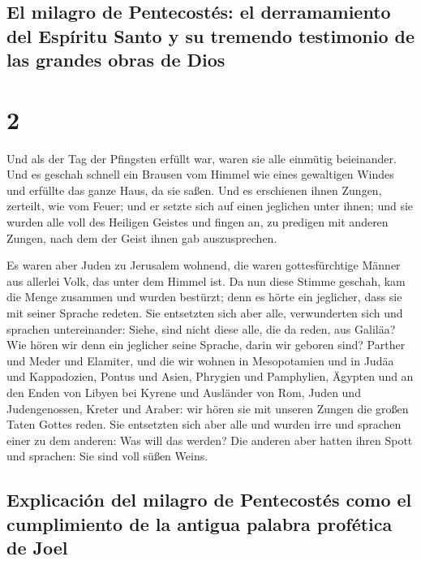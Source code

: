 \hypertarget{el-milagro-de-pentecostuxe9s-el-derramamiento-del-espuxedritu-santo-y-su-tremendo-testimonio-de-las-grandes-obras-de-dios}{%
\subsection{El milagro de Pentecostés: el derramamiento del Espíritu
Santo y su tremendo testimonio de las grandes obras de
Dios}\label{el-milagro-de-pentecostuxe9s-el-derramamiento-del-espuxedritu-santo-y-su-tremendo-testimonio-de-las-grandes-obras-de-dios}}

\hypertarget{section-1}{%
\section{2}\label{section-1}}

 Und als der Tag der Pfingsten erfüllt war, waren sie alle
einmütig beieinander.  Und es geschah schnell ein Brausen
vom Himmel wie eines gewaltigen Windes und erfüllte das ganze Haus, da
sie saßen.  Und es erschienen ihnen Zungen, zerteilt, wie
vom Feuer; und er setzte sich auf einen jeglichen unter ihnen;
 und sie wurden alle voll des Heiligen Geistes und fingen
an, zu predigen mit anderen Zungen, nach dem der Geist ihnen gab
auszusprechen.

 Es waren aber Juden zu Jerusalem wohnend, die waren
gottesfürchtige Männer aus allerlei Volk, das unter dem Himmel ist.
 Da nun diese Stimme geschah, kam die Menge zusammen und
wurden bestürzt; denn es hörte ein jeglicher, dass sie mit seiner
Sprache redeten.  Sie entsetzten sich aber alle,
verwunderten sich und sprachen untereinander: Siehe, sind nicht diese
alle, die da reden, aus Galiläa?  Wie hören wir denn ein
jeglicher seine Sprache, darin wir geboren sind?  Parther
und Meder und Elamiter, und die wir wohnen in Mesopotamien und in Judäa
und Kappadozien, Pontus und Asien,  Phrygien und
Pamphylien, Ägypten und an den Enden von Libyen bei Kyrene und Ausländer
von Rom,  Juden und Judengenossen, Kreter und Araber: wir
hören sie mit unseren Zungen die großen Taten Gottes reden.
 Sie entsetzten sich aber alle und wurden irre und
sprachen einer zu dem anderen: Was will das werden?  Die
anderen aber hatten ihren Spott und sprachen: Sie sind voll süßen Weins.

\hypertarget{explicaciuxf3n-del-milagro-de-pentecostuxe9s-como-el-cumplimiento-de-la-antigua-palabra-profuxe9tica-de-joel}{%
\subsection{Explicación del milagro de Pentecostés como el cumplimiento
de la antigua palabra profética de
Joel}\label{explicaciuxf3n-del-milagro-de-pentecostuxe9s-como-el-cumplimiento-de-la-antigua-palabra-profuxe9tica-de-joel}}

